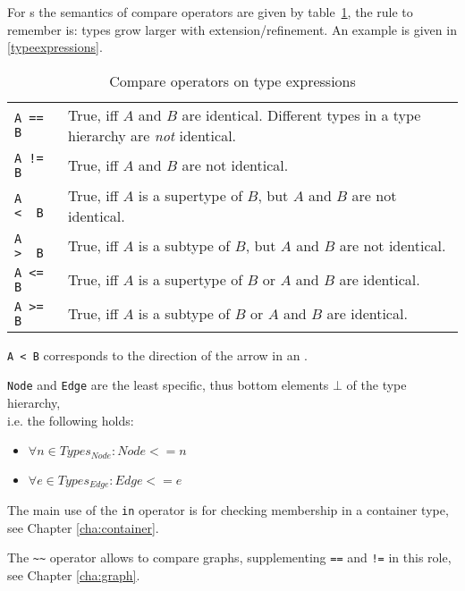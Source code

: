For s the semantics of compare operators are given by table~\ref{compandtypes},
the rule to remember is: types grow larger with extension/refinement. An example is given in \ref{typeexpressions}.
\begin{table}[htbp]
  \centering
  \begin{tabularx}{\linewidth}{|l|X|} \hline
    \texttt{A == B} & True, iff $A$ and $B$ are identical. Different types in a type hierarchy are \emph{not} identical. \\
    \texttt{A != B} & True, iff $A$ and $B$ are not identical. \\
    \texttt{A <\ \ B} & True, iff $A$ is a supertype of $B$, but $A$ and $B$ are not identical. \\
    \texttt{A >\ \ B} & True, iff $A$ is a subtype of $B$, but $A$ and $B$ are not identical. \\
    \texttt{A <= B} & True, iff $A$ is a supertype of $B$ or $A$ and $B$ are identical. \\
    \texttt{A >= B} & True, iff $A$ is a subtype of $B$ or $A$ and $B$ are identical. \\ \hline
  \end{tabularx}
  \caption{Compare operators on type expressions}
  \label{compandtypes}
\end{table}
\begin{note}
  \texttt{A < B} corresponds to the direction of the arrow in an .
\end{note}
\begin{note}
  \texttt{Node} and \texttt{Edge} are the least specific, thus bottom elements $\bot$ of the type hierarchy,\\
  i.e. the following holds:
  \begin{itemize}
    \item $\forall n\in Types_{Node}: Node <= n$
    \item $\forall e\in Types_{Edge}: Edge <= e$
  \end{itemize}
\end{note}

The main use of the \texttt{in} operator is for checking membership in a container type, see Chapter \ref{cha:container}.

The \texttt{\textasciitilde\textasciitilde} operator allows to compare graphs, supplementing \texttt{==} and \texttt{!=} in this role, see Chapter \ref{cha:graph}.

